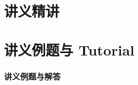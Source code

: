 \documentclass[11pt,a4paper,fontset=fandol]{ctexart}
\begin{document}
\maketitle
\coursenotestoc
\clearpage



\clearpage
\part{讲义精讲}


\clearpage
\part{讲义例题与 Tutorial}
\begin{groupedexercises}
\section{讲义例题与解答}

\clearpage

\end{groupedexercises}
\end{document}
